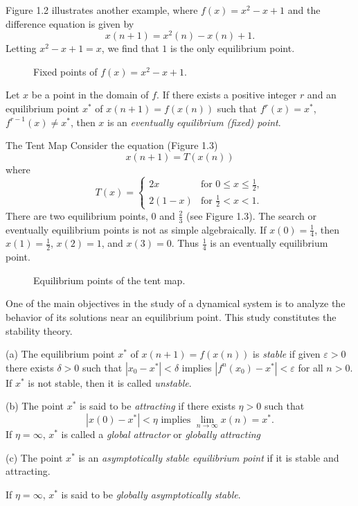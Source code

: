 Figure 1.2 illustrates another example, where $f(x)=x^2-x+1$ and the difference equation is given by
\[x(n+1)=x^2(n)-x(n)+1.\]
Letting $x^2-x+1=x$, we find that $1$ is the only equilibrium point.
\begin{figure}[H]
    \centering
    \caption{Fixed points of $f(x)=x^2-x+1$.}
\end{figure}

\begin{definition}
    Let $x$ be a point in the domain of $f$. If there exists a positive integer $r$ and an equilibrium point $x^*$ of $x(n+1)=f(x(n))$ such that $f^r(x)=x^*$, $f^{r-1}(x)\neq x^*$, then $x$ is an \textit{eventually equilibrium (fixed) point}.
\end{definition}

\begin{eg}
    \item The Tent Map
        Consider the equation (Figure 1.3)
        \[x(n+1)=T(x(n))\]
        where
        \[
            T(x)=\begin{cases}
                2x & \text{for }0\leq x\leq\frac{1}{2}, \\
                2(1-x) & \text{for }\frac{1}{2}<x<1.
            \end{cases}
        \]
        There are two equilibrium points, $0$ and $\frac{2}{3}$ (see Figure 1.3). The search or eventually equilibrium points is not as simple algebraically. If $x(0)=\frac{1}{4}$, then $x(1)=\frac{1}{2}$, $x(2)=1$, and $x(3)=0$. Thus $\frac{1}{4}$ is an eventually equilibrium point.
\begin{figure}[H]
    \centering
    \caption{Equilibrium points of the tent map.}
\end{figure}
\end{eg}

One of the main objectives in the study of a dynamical system is to analyze the behavior of its solutions near an equilibrium point. This study constitutes the stability theory.

\begin{definition}
    (a) The equilibrium point $x^*$ of $x(n+1)=f(x(n))$ is \textit{stable} if given $\varepsilon>0$ there exists $\delta>0$ such that $|x_0-x^*|<\delta$ implies $|f^n(x_0)-x^*|<\varepsilon$ for all $n>0$. If $x^*$ is not stable, then it is called \textit{unstable}.

    (b) The point $x^*$ is said to be \textit{attracting} if there exists $\eta>0$ such that
    \[|x(0)-x^*|<\eta\text{ implies }\lim_{n\to\infty} x(n)=x^*.\]
    If $\eta=\infty$, $x^*$ is called a \textit{global attractor} or \textit{globally attracting}
    
    (c) The point $x^*$ is an \textit{asymptotically stable equilibrium point} if it is stable and attracting.

    If $\eta=\infty$, $x^*$ is said to be \textit{globally asymptotically stable}.
\end{definition}

